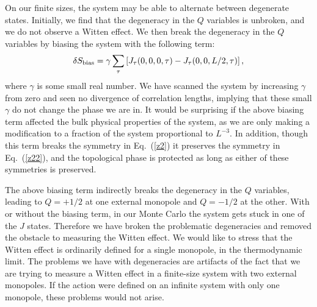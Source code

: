 \documentclass[prb,twocolumn]{revtex4-1}
\begin{document}
On our finite sizes, the system may be able to alternate between degenerate states. Initially, we find that the degeneracy in the $Q$ variables is unbroken, and we do not observe a Witten effect. We then break the degeneracy in the $Q$ variables by biasing the system with the following term:
\begin{equation}
\delta S_{\rm bias}=\gamma  \sum_{\tau}\left[J_\tau(0,0,0,\tau)-J_\tau(0,0,L/2,\tau)\right],
\label{bias}
\end{equation}
where $\gamma$ is some small real number. We have scanned the system by increasing $\gamma$ from zero and seen no divergence of correlation lengths, implying that these small $\gamma$ do not change the phase we are in. It would be surprising if the above biasing term affected the bulk physical properties of the system, as we are only making a modification to a fraction of the system proportional to $L^{-3}$. In addition, though this term breaks the symmetry in Eq.~(\ref{z2}) it preserves the symmetry in Eq.~(\ref{z22}), and the topological phase is protected as long as either of these symmetries is preserved. 

The above biasing term indirectly breaks the degeneracy in the $Q$ variables, leading to $Q=+1/2$ at one external monopole and $Q=-1/2$ at the other. With or without the biasing term, in our Monte Carlo the system gets stuck in one of the $J$ states. Therefore we have broken the problematic degeneracies and removed the obstacle to measuring the Witten effect. We would like to stress that the Witten effect is ordinarily defined for a single monopole, in the thermodynamic limit. The problems we have with degeneracies are artifacts of the fact that we are trying to measure a Witten effect in a finite-size system with two external monopoles. If the action were defined on an infinite system with only one monopole, these problems would not arise.
\end{document}
